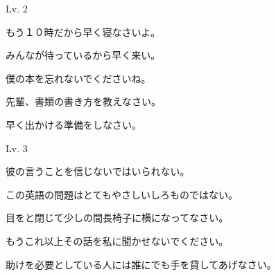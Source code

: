 	\begin{mondai}{Lv. 2}
		\item もう１０時だから早く寝なさいよ。
		\item みんなが待っているから早く来い。
		\item 僕の本を忘れないでくださいね。
		\item 先輩、書類の書き方を教えなさい。
		\item 早く出かける準備をしなさい。
	\end{mondai}

	\begin{mondai}{Lv. 3}
		\item 彼の言うことを信じないではいられない。
		\item この英語の問題はとてもやさしいしろものではない。
		\item 目をと閉じて少しの間長椅子に横になってなさい。
		\item もうこれ以上その話を私に聞かせないでください。
		\item 助けを必要としている人には誰にでも手を貸してあげなさい。
	\end{mondai}

	
